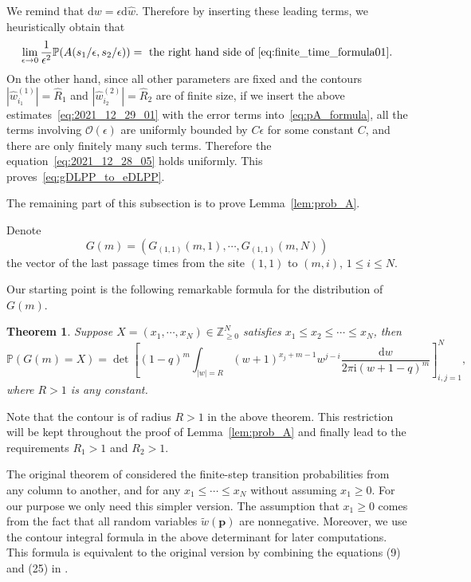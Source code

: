 \documentclass{article}
\newtheorem{thm}{Theorem}[section]
\numberwithin{equation}{section}
\newcommand{\bigO}{\mathcal{O}}
\newcommand{\ddbar}[2]{\frac{{\mathrm d}#1}{2\pi {\mathrm i}#2}}
\newcommand{\intZ}{\mathbb{Z}}
\newcommand{\prob}{\mathbb{P}}
\begin{document}
We remind that $\mathrm{d}w=\epsilon \mathrm{d}\hat w$. Therefore by inserting these leading terms, we heuristically obtain that
\begin{equation}
	\label{eq:2021_12_28_05}
	\lim_{\epsilon\to 0}\frac{1}{\epsilon^2}\prob(A(s_1/\epsilon,s_2/\epsilon)) = \text{ the right hand side of~\eqref{eq:finite_time_formula01}}.
\end{equation}
On the other hand, since all other parameters are fixed and the contours $|\hat w_{i_1}^{(1)}|=\hat R_1$ and $|\hat w_{i_2}^{(2)}|=\hat R_2$ are of finite size, if we insert the above estimates~\eqref{eq:2021_12_29_01} with the error terms into~\eqref{eq:pA_formula}, all the terms involving $\bigO(\epsilon)$ are uniformly bounded by $C\epsilon$ for some constant $C$, and there are only finitely many such terms. Therefore the equation~\eqref{eq:2021_12_28_05} holds uniformly. This proves~\eqref{eq:gDLPP_to_eDLPP}.
\bigskip


The remaining part of this subsection is to prove Lemma~\ref{lem:prob_A}.


Denote
\begin{equation}
	G(m) = \left(G_{(1,1)}(m,1),\cdots,G_{(1,1)}(m,N)\right)
\end{equation}
the vector of the last passage times from the site $(1,1)$ to $(m,i)$, $1\le i\le N$.

Our starting point is the following remarkable formula for the distribution of $G(m)$. 

\begin{thm}\cite[Theorem 2.1]{Johansson10}
	\label{thm:Joh}
	Suppose $X=(x_1,\cdots,x_N)\in\intZ_{\ge 0}^N$ satisfies $x_1\le x_2\le\cdots\le x_N$, then 
	\begin{equation*}
		\prob\left(G(m)=X\right)=\det\left[(1-q)^m\int_{|w|=R}(w+1)^{x_j+m-1}w^{j-i}\ddbar{w}{(w+1-q)^m}\right]_{i,j=1}^N,
	\end{equation*}
	where $R>1$ is any constant.
\end{thm}

Note that the contour is of radius $R>1$ in the above theorem. This restriction will be kept throughout the proof of Lemma~\ref{lem:prob_A} and finally lead to the requirements $R_1>1$ and $R_2>1$.

The original theorem of \cite[Theorem 2.1]{Johansson10} considered the finite-step transition probabilities from any column to another, and for any $x_1\le \cdots\le x_N$ without assuming $x_1\ge 0$. For our purpose we only need this simpler version. The assumption that $x_1\ge 0$ comes from the fact that all random variables $\tilde w(\mathbf{p})$ are nonnegative. Moreover, we use the contour integral formula in the above determinant for later computations. This formula is equivalent to the original version by combining the equations (9) and (25) in \cite{Johansson10}.
\end{document}
